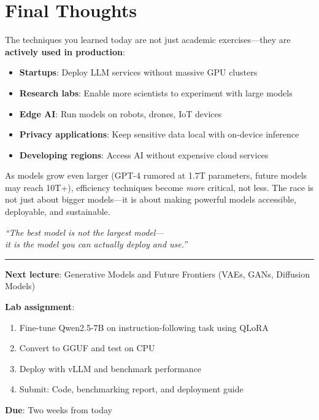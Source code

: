 \documentclass{article}
\begin{document}
\section{Final Thoughts}

The techniques you learned today are not just academic exercises---they are \textbf{actively used in production}:

\begin{itemize}
\item \textbf{Startups}: Deploy LLM services without massive GPU clusters
\item \textbf{Research labs}: Enable more scientists to experiment with large models
\item \textbf{Edge AI}: Run models on robots, drones, IoT devices
\item \textbf{Privacy applications}: Keep sensitive data local with on-device inference
\item \textbf{Developing regions}: Access AI without expensive cloud services
\end{itemize}

As models grow even larger (GPT-4 rumored at 1.7T parameters, future models may reach 10T+), efficiency techniques become \textit{more} critical, not less. The race is not just about bigger models---it is about making powerful models accessible, deployable, and sustainable.

\vspace{1cm}

\begin{center}
\textit{``The best model is not the largest model---}\\
\textit{it is the model you can actually deploy and use.''}
\end{center}

\vspace{1cm}

\hrule

\vspace{0.5cm}

\textbf{Next lecture}: Generative Models and Future Frontiers (VAEs, GANs, Diffusion Models)

\textbf{Lab assignment}:
\begin{enumerate}
\item Fine-tune Qwen2.5-7B on instruction-following task using QLoRA
\item Convert to GGUF and test on CPU
\item Deploy with vLLM and benchmark performance
\item Submit: Code, benchmarking report, and deployment guide
\end{enumerate}

\textbf{Due}: Two weeks from today
\end{document}
